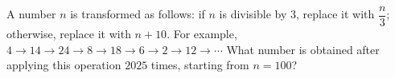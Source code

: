A number $n$ is transformed as follows: if $n$ is divisible by $3$, replace it with $\dfrac{n}{3}$; otherwise, replace it with $n+10$. For example, $4\to14\to24\to8\to18\to6\to2\to12\to\cdots$ What number is obtained after applying this operation $2025$ times, starting from $n=100$?
